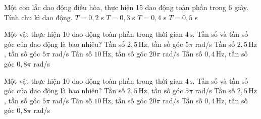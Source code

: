 \begin{ex}
Một con lắc dao động điều hòa, thực hiện 15 dao động toàn phần trong 6 giây. Tính chu kì dao động.
\choice
{$T = 0{,}2$ s}
{$T = 0{,}3$ s}
{\True $T = 0{,}4$ s}
{$T = 0{,}5$ s}
\end{ex}

\begin{ex}
Một vật thực hiện 10 dao động toàn phần trong thời gian $4\,\text{s}$. Tần số và tần số góc của dao động là bao nhiêu?
\choice
{Tần số $2,5\,\text{Hz}$, tần số góc $5\pi$ rad/s}
{\True Tần số $2,5\,\text{Hz}$, tần số góc $5\pi$ rad/s}
{Tần số $10\,\text{Hz}$, tần số góc $20\pi$ rad/s}
{Tần số $0,4\,\text{Hz}$, tần số góc $0,8\pi$ rad/s}
\end{ex}

\begin{ex}
Một vật thực hiện 10 dao động toàn phần trong thời gian $4\,\text{s}$. Tần số và tần số góc của dao động là bao nhiêu?
\choice
{Tần số $2,5\,\text{Hz}$, tần số góc $5\pi$ rad/s}
{\True Tần số $2,5\,\text{Hz}$, tần số góc $5\pi$ rad/s}
{Tần số $10\,\text{Hz}$, tần số góc $20\pi$ rad/s}
{Tần số $0,4\,\text{Hz}$, tần số góc $0,8\pi$ rad/s}
\end{ex}

